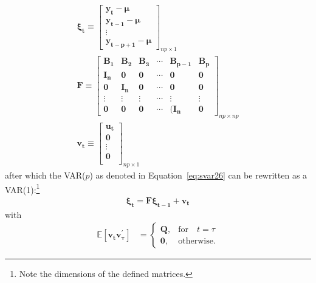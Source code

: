 \documentclass[a4paper,11pt,listof=nochaptergap,oneside,pointednumbers,bibtotoc,bigheadings,liststotoc]{scrbook}
\newcommand{\vect}[1]{\boldsymbol{\mathbf{#1}}}
\begin{document}
\begin{enumerate}
\begin{equation}
\begin{split}
		\vect{\xi_t}	 \equiv \begin{bmatrix}
    						\vect{y_t}-\vect{\mu}\\
						\vect{y_{t-1}}-\vect{\mu} \\
						\vdots \\
						\vect{y_{t-p+1}}-\vect{\mu}
 						\end{bmatrix}_{np \times 1} \\
		\vect{F} \equiv \begin{bmatrix}
    						\vect{B_1} & \vect{B_2} & \vect{B_3} & \cdots & \vect{B_{p-1}} & \vect{B_p}\\
						\vect{I_n} & \vect{0} & \vect{0} & \cdots & \vect{0} & \vect{0}\\
						\vect{0} & \vect{I_n} & \vect{0} & \cdots & \vect{0} & \vect{0}\\
						\vdots & \vdots & \vdots & \cdots & \vdots & \vdots\\
						\vect{0} & \vect{0} & \vect{0} & \cdots & \vect{(I_n} & \vect{0}
 						\end{bmatrix}_{np \times np}\\
		\vect{v_t} \equiv \begin{bmatrix}
    						\vect{u_t} \\
						\vect{0} \\
						\vdots \\
						\vect{0} \\
 						\end{bmatrix}_{np \times 1}
	\end{split}								
	\end{equation}	
	after which the VAR($p$) as denoted in Equation~\ref{eq:svar26} can be rewritten as a VAR(1):\footnote{Note the dimensions of the defined matrices.}
	\begin{equation} \label{eq:svar28}
	\begin{split}
		\vect{\xi_t} = \vect{F}\vect{\xi_{t-1}} + \vect{v_t}
	\end{split}								
	\end{equation}	
	with
	\begin{equation} \label{eq:svar29}
	\begin{split}
		\mathbb{E}[\vect{v_t}\vect{v_{\tau}^'}] & =     \begin{cases}
      												\vect{Q}, & \text{for} \quad t = \tau \\
      												\vect{0}, & \text{otherwise.}
										\end{cases}
	\end{split}

\end{equation}
\end{enumerate}
\end{document}
